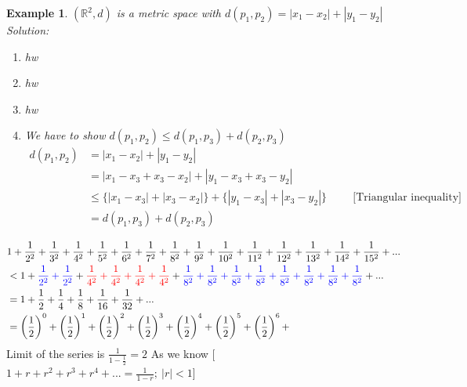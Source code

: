 \documentclass{article}
\newtheorem{example}{Example}[section]
\newcommand{\hs}{\hspace}
\newcommand{\vs}{\vspace}
\newcommand{\ds}{\displaystyle}
\begin{document}
\vs{0.75cm}
\begin{example}
    $(\mathbb{R}^2,d)$ is a metric space with $\ds d(p_1,p_2)=|x_1-x_2|+|y_1-y_2|$\\
    \textit{Solution:}\\
    \begin{enumerate}
        \item hw
        \item hw
        \item hw
        \item We have to show $d(p_1,p_2)\leq d(p_1,p_3)+d(p_2,p_3)$
            \begin{align*}
                d(p_1,p_2)&=|x_1-x_2|+|y_1-y_2|\\
                &=|x_1-x_3+x_3-x_2|+|y_1-x_3+x_3-y_2|\\
                &\leq \{|x_1-x_3|+|x_3-x_2|\}+\{|y_1-x_3|+|x_3-y_2|\}\hs{1cm}\text{[Triangular inequality]}\\
                &= d(p_1,p_3)+d(p_2,p_3)
            \end{align*}
    \end{enumerate}
\end{example}
\vs{0.75cm}
\begin{align*}
    & 1+\frac{1}{2^2}+\frac{1}{3^2}+\frac{1}{4^2}+\frac{1}{5^2}+\frac{1}{6^2}+\frac{1}{7^2}+\frac{1}{8^2}+\frac{1}{9^2}+\frac{1}{10^2}+\frac{1}{11^2}+\frac{1}{12^2}+\frac{1}{13^2}+\frac{1}{14^2}+\frac{1}{15^2}+...\\
    &< 1+\textcolor{blue}{\frac{1}{2^2}+\frac{1}{2^2}}+\textcolor{red}{\frac{1}{4^2}+\frac{1}{4^2}+\frac{1}{4^2}+\frac{1}{4^2}}+\textcolor{blue}{\frac{1}{8^2}+\frac{1}{8^2}+\frac{1}{8^2}+\frac{1}{8^2}+\frac{1}{8^2}+\frac{1}{8^2}+\frac{1}{8^2}+\frac{1}{8^2}}+...\\
    &=1+\frac{1}{2}+\frac{1}{4}+\frac{1}{8}+\frac{1}{16}+\frac{1}{32}+...\\
    &=\ds \left(\frac{1}{2}\right)^0+\left(\frac{1}{2}\right)^1+\left(\frac{1}{2}\right)^2+\left(\frac{1}{2}\right)^3+\left(\frac{1}{2}\right)^4+\left(\frac{1}{2}\right)^5+\left(\frac{1}{2}\right)^6+
\end{align*}
Limit of the series is $\ds \frac{1}{1-\ds\frac{1}{2}}=2$ \qquad As we know
[$\ds 1+r+r^2+r^3+r^4+...=\frac{1}{1-r}; \ |r|<1$]\\
\end{document}
